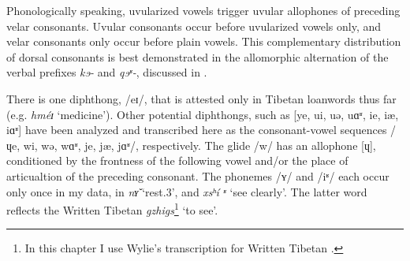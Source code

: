 \documentclass[output=paper]{langscibook}
\begin{document}
Phonologically speaking, uvularized vowels trigger uvular allophones of preceding velar consonants. Uvular consonants occur before uvularized vowels only, and velar consonants only occur before plain vowels. This complementary distribution of dorsal consonants is best demonstrated in the allomorphic alternation of the verbal prefixes \textit{kɘ-} and \textit{qɘʶ-}, discussed in .

There is one diphthong, /eɪ/, that is attested only in Tibetan loanwords thus far (e.g. \textit{hméɪ} ‘medicine’). Other potential diphthongs, such as [ye, ui, uə, uɑʶ, ie, iæ, iɑʶ] have been analyzed and transcribed here as the consonant\hyp vowel sequences /ɥe, wi, wə, wɑʶ, je, jæ, jɑʶ/, respectively. The glide /w/ has an allophone [ɥ], conditioned by the frontness of the following vowel and/or the place of articualtion of the preceding consonant. The phonemes /ʏ/ and /iʶ/ each occur only once in my data, in \textit{nʏ̌{} } ‘rest.3’, and \textit{xsʰí{} ʶ} ‘see clearly’. The latter word reflects the Written Tibetan \textit{gzhigs}\footnote{In this chapter I use Wylie's transcription for Written Tibetan \citep{Wylie1959}.} ‘to see’. 
\end{document}

